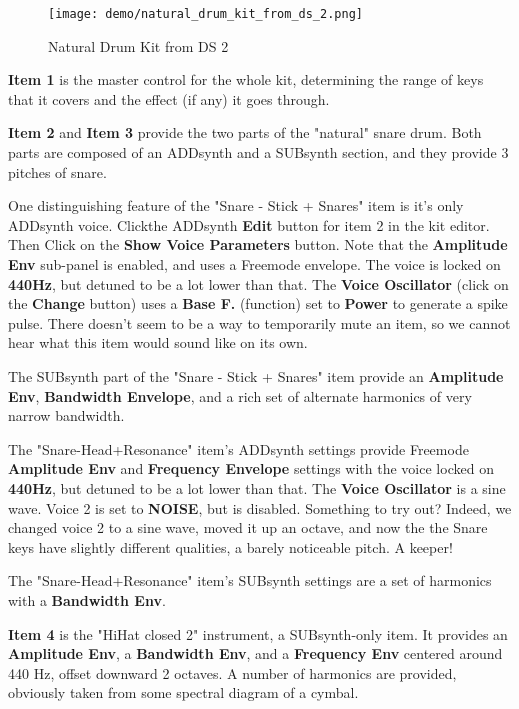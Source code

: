\begin{figure}[H]
   \centering 
   \texttt{[image: demo/natural\_drum\_kit\_from\_ds\_2.png]}
   \caption{Natural Drum Kit from DS 2}
   \label{fig:cookbook_bank_natural_drum_kit}
\end{figure}

   \textbf{Item 1} is the master control for the whole kit, determining the
   range of keys that it covers and the effect (if any) it goes through.

   \textbf{Item 2} and \textbf{Item 3} provide the two parts of the
   "natural" snare drum.  Both parts are composed of an ADDsynth and a
   SUBsynth section, and they provide 3 pitches of snare.

   One distinguishing feature of the "Snare - Stick + Snares" item
   is it's only ADDsynth voice.  Clickthe ADDsynth \textbf{Edit} button for
   item 2 in the kit editor.  Then Click on the
   \textbf{Show Voice Parameters} button.
   Note that the \textbf{Amplitude Env} sub-panel is enabled, and uses a
   Freemode envelope.  The voice is locked on \textbf{440Hz}, but detuned to
   be a lot lower than that.  The \textbf{Voice Oscillator}
   (click on the \textbf{Change} button) uses a
   \textbf{Base F.} (function)
   set to \textbf{Power}
   to generate a spike pulse.
   There doesn't seem to be a way to temporarily mute an item, so we cannot
   hear what this item would sound like on its own.

   The SUBsynth part of the "Snare - Stick + Snares" item provide an
   \textbf{Amplitude Env}, \textbf{Bandwidth Envelope}, and a rich set of
   alternate harmonics of very narrow bandwidth.

   The "Snare-Head+Resonance" item's ADDsynth settings 
   provide Freemode \textbf{Amplitude Env} and \textbf{Frequency Envelope}
   settings with the voice locked on \textbf{440Hz}, but detuned to
   be a lot lower than that.  The \textbf{Voice Oscillator} is a sine wave.
   Voice 2 is set to \textbf{NOISE}, but is disabled.  Something to try out?
   Indeed, we changed voice 2 to a sine wave, moved it up an octave,
   and now the the Snare keys have slightly different qualities, a barely
   noticeable pitch.  A keeper!

   The "Snare-Head+Resonance" item's SUBsynth settings are a set of
   harmonics with a \textbf{Bandwidth Env}.

   \textbf{Item 4} is the "HiHat closed 2" instrument, a SUBsynth-only item.
   It provides an \textbf{Amplitude Env}, a \textbf{Bandwidth Env},
   and a \textbf{Frequency Env} centered around 440 Hz, offset downward 2
   octaves.  A number of harmonics are provided, obviously taken from some
   spectral diagram of a cymbal.

